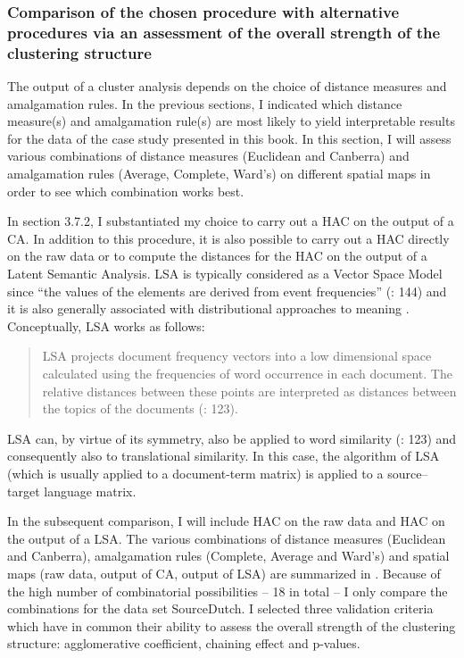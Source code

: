 \subsubsection{\label{sec:3.7.2.4}  Comparison of the chosen procedure with alternative procedures via an assessment of the overall strength of the clustering structure}

The output of a cluster analysis depends on the choice of distance measures and amalgamation rules. In the previous sections, I indicated which distance measure(s) and amalgamation rule(s) are most likely to yield interpretable results for the data of the case study presented in this book. In this section, I will assess various combinations of distance measures (Euclidean and Canberra) and amalgamation rules (Average, Complete, Ward’s) on different spatial maps in order to see which combination works best.



In section 3.7.2, I substantiated my choice to carry out a HAC on the output of a CA. In addition to this procedure, it is also possible to carry out a HAC directly on the raw data or to compute the distances for the HAC on the output of a Latent Semantic Analysis. LSA is typically considered as a Vector Space Model since “the values of the elements are derived from event frequencies” (\citealt{turney_frequency_2010}: 144) and it is also generally associated with distributional approaches to meaning \citep[141]{turney_frequency_2010}. Conceptually, LSA works as follows:


\begin{quote}
LSA projects document frequency vectors into a low dimensional space calculated using the frequencies of word occurrence in each document. The relative distances between these points are interpreted as distances between the topics of the documents (\citealt{mehler_models_2007}: 123).
\end{quote}


LSA can, by virtue of its symmetry, also be applied to word similarity (\citealt{mehler_models_2007}: 123) and consequently also to translational similarity. In this case, the algorithm of LSA (which is usually applied to a document-term matrix) is applied to a source–target language matrix.



In the subsequent comparison, I will include HAC on the raw data and HAC on the output of a LSA. The various combinations of distance measures (Euclidean and Canberra), amalgamation rules (Complete, Average and Ward’s) and spatial maps (raw data, output of CA, output of LSA) are summarized in . Because of the high number of combinatorial possibilities – 18 in total – I only compare the combinations for the data set SourceDutch. I selected three validation criteria which have in common their ability to assess the overall strength of the clustering structure: agglomerative coefficient, chaining effect and p-values.



